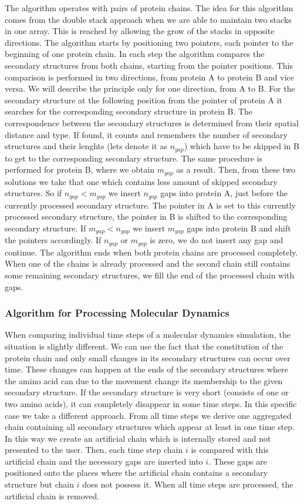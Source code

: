 \documentclass[twocolumn]{bmcart}%
\begin{document}
The algorithm operates with pairs of protein chains.
The idea for this algorithm comes from the double stack approach when we are able to maintain two stacks in one array.
This is reached by allowing the grow of the stacks in opposite directions.
The algorithm starts by positioning two pointers, each pointer to the beginning of one protein chain.
In each step the algorithm compares the secondary structures from both chains, starting from the pointer positions.
This comparison is performed in two directions, from protein A to protein B and vice versa.
We will describe the principle only for one direction, from A to B.
For the secondary structure at the following position from the pointer of protein A it searches for the corresponding secondary structure in protein B.
The correspondence between the secondary structures is determined from their spatial distance and type.
If found, it counts and remembers the number of secondary structures and their lenghts (lets denote it as $n_{gap}$) which have to be skipped in B to get to the corresponding secondary structure.
The same procedure is performed for protein B, where we obtain $m_{gap}$ as a result.
Then, from these two solutions we take that one which contains less amount of skipped secondary structures.
So if $n_{gap} < m_{gap}$ we insert $n_{gap}$ gaps into protein A, just before the currently processed secondary structure.
The pointer in A is set to this currently processed secondary structure, the pointer in B is shifted to the corresponding secondary structure.
If $m_{gap} < n_{gap}$ we insert $m_{gap}$ gaps into protein B and shift the pointers accordingly.
If $n_{gap}$ or $m_{gap}$ is zero, we do not insert any gap and continue.
The algorithm ends when both protein chains are processed completely.
When one of the chains is already processed and the second chain still contains some remaining secondary structures, we fill the end of the processed chain with gaps.

\subsubsection*{Algorithm for Processing Molecular Dynamics}
When comparing individual time steps of a molecular dynamics simulation, the situation is slightly different. 
We can use the fact that the constitution of the protein chain and only small changes in its secondary structures can occur over time.
These changes can happen at the ends of the secondary structures where the amino acid can due to the movement change its membership to the given secondary structure.
If the secondary structure is very short (consists of one or two amino acids), it can completely disappear in some time steps.
In this specific case we take a different approach.
From all time steps we derive one aggregated chain containing all secondary structures which appear at least in one time step. 
In this way we create an artificial chain which is internally stored and not presented to the user.
Then, each time step chain $i$ is compared with this artificial chain and the necessary gaps are inserted into $i$.
These gaps are positioned onto the places where the artificial chain contains a secondary structure but chain $i$ does not possess it. 
When all time steps are processed, the artificial chain is removed.
\end{document}
